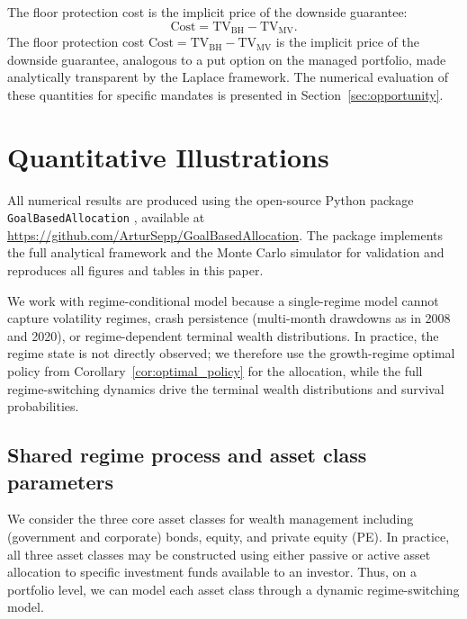 \documentclass[11pt,a4paper]{article}
\numberwithin{equation}{section}
\begin{document}
The floor protection cost is the implicit price of the downside guarantee:
\begin{equation}\label{eq:floor_cost}
\mathrm{Cost} = \mathrm{TV}_{\mathrm{BH}} - \mathrm{TV}_{\mathrm{MV}}.
\end{equation}
The floor protection cost $\mathrm{Cost} = \mathrm{TV}_{\mathrm{BH}} - \mathrm{TV}_{\mathrm{MV}}$ is the implicit price of the downside guarantee, analogous to a put option on the managed portfolio, made analytically transparent by the Laplace framework.  The numerical evaluation of these quantities for specific mandates is presented in Section~\ref{sec:opportunity}.


\section{Quantitative Illustrations}\label{sec:numerics}

All numerical results are produced using the open-source Python 
package \texttt{GoalBasedAllocation} \citep{SeppGBA2026}, available 
at \url{https://github.com/ArturSepp/GoalBasedAllocation}. The 
package implements the full analytical framework and the Monte Carlo simulator for 
validation and reproduces all figures and tables in this paper.


We work with regime-conditional model because a single-regime model cannot capture volatility regimes, crash persistence 
(multi-month drawdowns as in 2008 and 2020), or regime-dependent terminal 
wealth distributions. In practice, the regime state is not directly observed; 
we therefore use the growth-regime optimal policy from 
Corollary~\ref{cor:optimal_policy} for the allocation, while the full 
regime-switching dynamics drive the terminal wealth distributions and 
survival probabilities.


\subsection{Shared regime process and asset class parameters}\label{sec:params_table}

We consider the three core asset classes for wealth management including (government and corporate) bonds, equity, and private equity (PE). In practice, all three asset classes may be constructed using either passive or active asset allocation to specific investment funds available to an investor. Thus, on a portfolio level, we can model each asset class through a dynamic regime-switching model.
\end{document}

